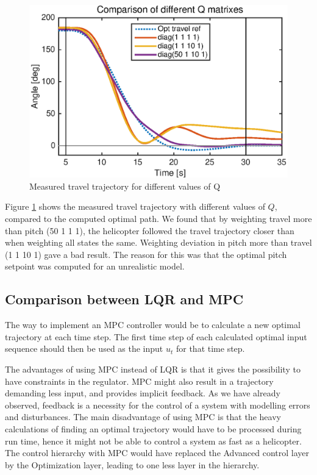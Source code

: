 \begin{figure}[htb]
    \centering
        \includegraphics[width=1.0\textwidth]{figures/day3/plot_day3_allQ}
    \caption{Measured travel trajectory for different values of Q}
    \label{fig:day3_plot_allQ}
\end{figure}

Figure \ref{fig:day3_plot_allQ} shows the measured travel trajectory with different values of $Q$, compared to the computed optimal path. We found that by weighting travel more than pitch (50 1 1 1), the helicopter followed the travel trajectory closer than when weighting all states the same. Weighting deviation in pitch more than travel (1 1 10 1) gave a bad result. The reason for this was that the optimal pitch setpoint was computed for an unrealistic model.

\subsection{Comparison between LQR and MPC}
The way to implement an MPC controller would be to calculate a new optimal trajectory at each time step. The first time step of each calculated optimal input sequence should then be used as the input $u_t$ for that time step.

The advantages of using MPC instead of LQR is that it gives the possibility to have constraints in the regulator. MPC might also result in a trajectory demanding less input, and provides implicit feedback. As we have already observed, feedback is a necessity for the control of a system with modelling errors and disturbances.
The main disadvantage of using MPC is that the heavy calculations of finding an optimal trajectory would have to be processed during run time, hence it might not be able to control a system as fast as a helicopter.
The control hierarchy with MPC would have replaced the Advanced control layer by the Optimization layer, leading to one less layer in the hierarchy.
